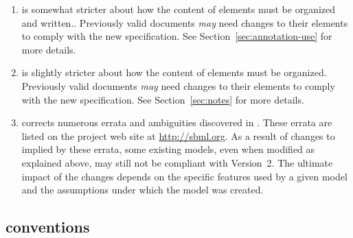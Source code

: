 \begin{enumerate}
\item \sbmltwotwo is somewhat stricter about how the content of
   elements must be organized and written..
  Previously valid \sbmltwoone documents \emph{may} need changes
  to their  elements to comply with the new
  specification.  See Section~\ref{sec:annotation-use} for more
  details.
  
\item \sbmltwotwo is slightly stricter about how the content of
   elements must be organized.  Previously valid
  \sbmltwoone documents \emph{may} need changes to their
   elements to comply with the new specification.  See
  Section~\ref{sec:notes} for more details. 
  
\item \sbmltwotwo corrects numerous errata and ambiguities
  discovered in \sbmltwoone.  These errata are listed on the
  project web site at \url{http://sbml.org}.  As a result of
  changes to \sbmltwo implied by these errata, some existing
  \sbmltwoone models, even when modified as explained above, may
  still not be compliant with Version~2.  The ultimate impact of
  the changes depends on the specific features used by a given
  model and the assumptions under which the model was created.


\end{enumerate}


\subsection{ conventions}
\label{sec:notation}

